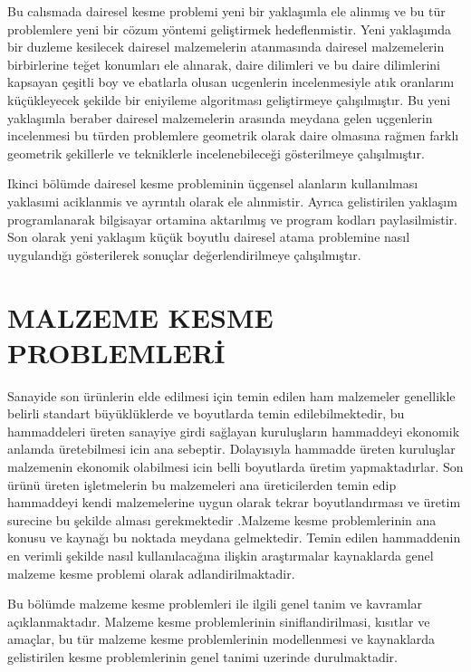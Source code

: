 \documentclass[]{book}
\begin{document}
Bu calısmada dairesel kesme problemi yeni bir yaklaşımla ele alinmış ve bu tür problemlere yeni bir cözum yöntemi geliştirmek hedeflenmistir. Yeni yaklaşımda bir duzleme kesilecek dairesel malzemelerin atanmasında dairesel malzemelerin birbirlerine teğet konumları ele alınarak, daire dilimleri ve bu daire dilimlerini kapsayan çeşitli boy ve ebatlarla olusan ucgenlerin incelenmesiyle atık oranlarını küçükleyecek şekilde bir eniyileme algoritması geliştirmeye çalışılmıştır. Bu yeni yaklaşımla beraber dairesel malzemelerin arasında meydana gelen uçgenlerin incelenmesi bu türden problemlere geometrik olarak daire olmasına rağmen farklı geometrik şekillerle ve tekniklerle incelenebileceği gösterilmeye çalışılmıştır.

Ikinci bölümde dairesel kesme probleminin üçgensel alanların kullanılması yaklasımi aciklanmis ve ayrıntılı olarak ele alınmistir. Ayrıca gelistirilen yaklaşım programlanarak bilgisayar ortamina aktarılmış ve program kodları paylasilmistir. Son olarak yeni yaklaşım küçük boyutlu dairesel atama problemine nasıl uygulandığı gösterilerek sonuçlar değerlendirilmeye çalışılmıştır.

\hypertarget{malzeme-kesme-problemleri}{%
\chapter{MALZEME KESME PROBLEMLERİ}\label{malzeme-kesme-problemleri}}

Sanayide son ürünlerin elde edilmesi için temin edilen ham malzemeler genellikle belirli standart büyüklüklerde ve boyutlarda temin edilebilmektedir, bu hammaddeleri üreten sanayiye girdi sağlayan kuruluşların hammaddeyi ekonomik anlamda üretebilmesi icin ana sebeptir. Dolayısıyla hammadde üreten kuruluşlar malzemenin ekonomik olabilmesi icin belli boyutlarda üretim yapmaktadırlar. Son ürünü üreten işletmelerin bu malzemeleri ana üreticilerden temin edip hammaddeyi kendi malzemelerine uygun olarak tekrar boyutlandırması ve üretim surecine bu şekilde alması gerekmektedir .Malzeme kesme problemlerinin ana konusu ve kaynağı bu noktada meydana gelmektedir. Temin edilen hammaddenin en verimli şekilde nasıl kullanılacağına ilişkin araştırmalar kaynaklarda genel malzeme kesme problemi olarak adlandirilmaktadir.

Bu bölümde malzeme kesme problemleri ile ilgili genel tanim ve kavramlar açıklanmaktadır. Malzeme kesme problemlerinin siniflandirilmasi, kısıtlar ve amaçlar, bu tür malzeme kesme problemlerinin modellenmesi ve kaynaklarda gelistirilen kesme problemlerinin genel tanimi uzerinde durulmaktadir.
\end{document}
